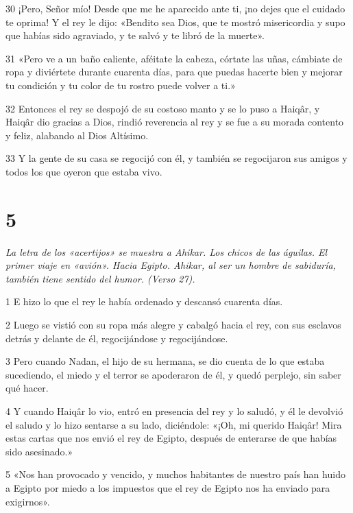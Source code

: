 \par 30 ¡Pero, Señor mío! Desde que me he aparecido ante ti, ¡no dejes que el cuidado te oprima! Y el rey le dijo: «Bendito sea Dios, que te mostró misericordia y supo que habías sido agraviado, y te salvó y te libró de la muerte».

\par 31 «Pero ve a un baño caliente, aféitate la cabeza, córtate las uñas, cámbiate de ropa y diviértete durante cuarenta días, para que puedas hacerte bien y mejorar tu condición y tu color de tu rostro puede volver a ti.»

\par 32 Entonces el rey se despojó de su costoso manto y se lo puso a Haiqâr, y Haiqâr dio gracias a Dios, rindió reverencia al rey y se fue a su morada contento y feliz, alabando al Dios Altísimo.

\par 33 Y la gente de su casa se regocijó con él, y también se regocijaron sus amigos y todos los que oyeron que estaba vivo.

\chapter{5}

\par \textit{La letra de los «acertijos» se muestra a Ahikar. Los chicos de las águilas. El primer viaje en «avión». Hacia Egipto. Ahikar, al ser un hombre de sabiduría, también tiene sentido del humor. (Verso 27).}

\par 1 E hizo lo que el rey le había ordenado y descansó cuarenta días.

\par 2 Luego se vistió con su ropa más alegre y cabalgó hacia el rey, con sus esclavos detrás y delante de él, regocijándose y regocijándose.

\par 3 Pero cuando Nadan, el hijo de su hermana, se dio cuenta de lo que estaba sucediendo, el miedo y el terror se apoderaron de él, y quedó perplejo, sin saber qué hacer.

\par 4 Y cuando Haiqâr lo vio, entró en presencia del rey y lo saludó, y él le devolvió el saludo y lo hizo sentarse a su lado, diciéndole: «¡Oh, mi querido Haiqâr! Mira estas cartas que nos envió el rey de Egipto, después de enterarse de que habías sido asesinado.»

\par 5 «Nos han provocado y vencido, y muchos habitantes de nuestro país han huido a Egipto por miedo a los impuestos que el rey de Egipto nos ha enviado para exigirnos».

